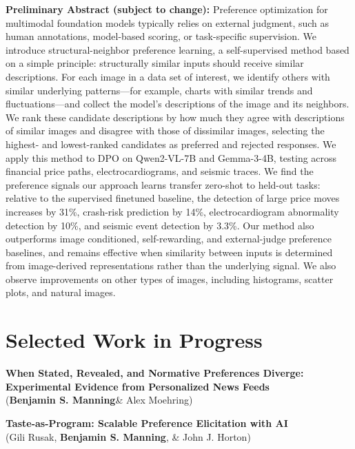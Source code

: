 \documentclass[margin,line,pifont,palatino,courier, 9pt]{res}
\begin{document}
\begin{resume}
\begin{singlespace}
\footnotesize
\textbf{Preliminary Abstract (subject to change):}
Preference optimization for multimodal foundation models typically relies on external judgment, such as human annotations, model-based scoring, or task-specific supervision.
We introduce structural-neighbor preference learning, a self-supervised method based on a simple principle: structurally similar inputs should receive similar descriptions.
For each image in a data set of interest, we identify others with similar underlying patterns---for example, charts with similar trends and fluctuations---and collect the model's descriptions of the image and its neighbors.
We rank these candidate descriptions by how much they agree with descriptions of similar images and disagree with those of dissimilar images, selecting the highest- and lowest-ranked candidates as preferred and rejected responses.
We apply this method to DPO on Qwen2-VL-7B and Gemma-3-4B, testing across financial price paths, electrocardiograms, and seismic traces.
We find the preference signals our approach learns transfer zero-shot to held-out tasks: relative to the supervised finetuned baseline, the detection of large price moves increases by 31\%, crash-risk prediction by 14\%, electrocardiogram abnormality detection by 10\%, and seismic event detection by 3.3\%.
Our method also outperforms image conditioned, self-rewarding, and external-judge preference baselines, and remains effective when similarity between inputs is determined from image-derived representations rather than the underlying signal.
We also observe improvements on other types of images, including histograms, scatter plots, and natural images.
\end{singlespace}



\section{\sc Selected Work in Progress}


{\bf When Stated, Revealed, and Normative Preferences Diverge: Experimental Evidence from Personalized News Feeds}\\
(\textbf{Benjamin S. Manning}\footnotemark[\value{footnote}] \& Alex Moehring\footnotemark[\value{footnote}])

{\bf Taste-as-Program: Scalable Preference Elicitation with AI}\\
(Gili Rusak\footnotemark[\value{footnote}], \textbf{Benjamin S. Manning}\footnotemark[\value{footnote}], \& John J. Horton)


\end{resume}
\end{document}
